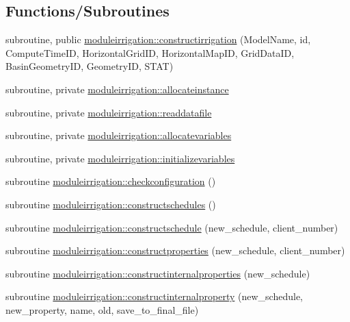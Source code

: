 \subsection*{Functions/\+Subroutines}
\begin{DoxyCompactItemize}
\item 
subroutine, public \mbox{\hyperlink{namespacemoduleirrigation_a1533651367025ce2df52f548e83ecf32}{moduleirrigation\+::constructirrigation}} (Model\+Name, id, Compute\+Time\+ID, Horizontal\+Grid\+ID, Horizontal\+Map\+ID, Grid\+Data\+ID, Basin\+Geometry\+ID, Geometry\+ID, S\+T\+AT)
\item 
subroutine, private \mbox{\hyperlink{namespacemoduleirrigation_abf07b20393874412d5ace40cf035088a}{moduleirrigation\+::allocateinstance}}
\item 
subroutine, private \mbox{\hyperlink{namespacemoduleirrigation_ae53033583e6896d868b4b65aa406c69f}{moduleirrigation\+::readdatafile}}
\item 
subroutine, private \mbox{\hyperlink{namespacemoduleirrigation_af29d54feea0c7cea86e11b179c4a36a3}{moduleirrigation\+::allocatevariables}}
\item 
subroutine, private \mbox{\hyperlink{namespacemoduleirrigation_ae48537ba7c81436db04d271739290617}{moduleirrigation\+::initializevariables}}
\item 
subroutine \mbox{\hyperlink{namespacemoduleirrigation_aa85b5fec6716d256db1e856f29f36468}{moduleirrigation\+::checkconfiguration}} ()
\item 
subroutine \mbox{\hyperlink{namespacemoduleirrigation_a6339c6a7568266fb2911688be44e1957}{moduleirrigation\+::constructschedules}} ()
\item 
subroutine \mbox{\hyperlink{namespacemoduleirrigation_a46de92ffaac8fbd782bdcdf682a48601}{moduleirrigation\+::constructschedule}} (new\+\_\+schedule, client\+\_\+number)
\item 
subroutine \mbox{\hyperlink{namespacemoduleirrigation_a3c38f9eb6c59407d288913caba5f6569}{moduleirrigation\+::constructproperties}} (new\+\_\+schedule, client\+\_\+number)
\item 
subroutine \mbox{\hyperlink{namespacemoduleirrigation_ab5de3f1600faba7f4c6ae843ce15e5e3}{moduleirrigation\+::constructinternalproperties}} (new\+\_\+schedule)
\item 
subroutine \mbox{\hyperlink{namespacemoduleirrigation_ae801aa6c2bc91136e80b57fea94668d1}{moduleirrigation\+::constructinternalproperty}} (new\+\_\+schedule, new\+\_\+property, name, old, save\+\_\+to\+\_\+final\+\_\+file)
\item 

\end{DoxyCompactItemize}
